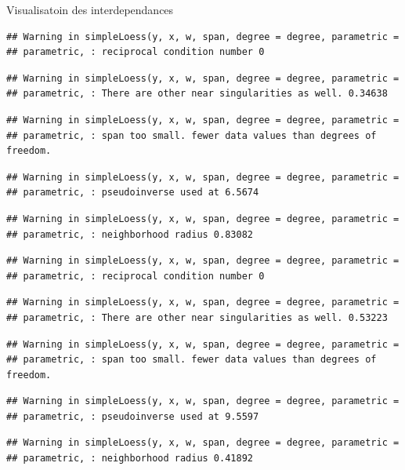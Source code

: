 \documentclass[11pt,ignorenonframetext,]{beamer}
\begin{document}
\begin{frame}[fragile]{Visualisatoin des interdependances}
\begin{verbatim}
## Warning in simpleLoess(y, x, w, span, degree = degree, parametric =
## parametric, : reciprocal condition number 0
\end{verbatim}

\begin{verbatim}
## Warning in simpleLoess(y, x, w, span, degree = degree, parametric =
## parametric, : There are other near singularities as well. 0.34638
\end{verbatim}

\begin{verbatim}
## Warning in simpleLoess(y, x, w, span, degree = degree, parametric =
## parametric, : span too small. fewer data values than degrees of freedom.
\end{verbatim}

\begin{verbatim}
## Warning in simpleLoess(y, x, w, span, degree = degree, parametric =
## parametric, : pseudoinverse used at 6.5674
\end{verbatim}

\begin{verbatim}
## Warning in simpleLoess(y, x, w, span, degree = degree, parametric =
## parametric, : neighborhood radius 0.83082
\end{verbatim}

\begin{verbatim}
## Warning in simpleLoess(y, x, w, span, degree = degree, parametric =
## parametric, : reciprocal condition number 0
\end{verbatim}

\begin{verbatim}
## Warning in simpleLoess(y, x, w, span, degree = degree, parametric =
## parametric, : There are other near singularities as well. 0.53223
\end{verbatim}

\begin{verbatim}
## Warning in simpleLoess(y, x, w, span, degree = degree, parametric =
## parametric, : span too small. fewer data values than degrees of freedom.
\end{verbatim}

\begin{verbatim}
## Warning in simpleLoess(y, x, w, span, degree = degree, parametric =
## parametric, : pseudoinverse used at 9.5597
\end{verbatim}

\begin{verbatim}
## Warning in simpleLoess(y, x, w, span, degree = degree, parametric =
## parametric, : neighborhood radius 0.41892
\end{verbatim}


\end{frame}
\end{document}
